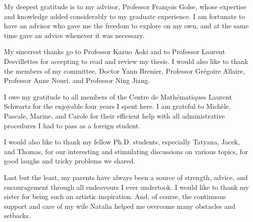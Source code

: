 My deepest gratitude is to my advisor, Professor François Golse, whose expertise and knowledge added considerably to my graduate experience. I am fortunate to have an advisor who gave me the freedom to explore on my own, and at the same time gave an advice whenever it was necessary.

My sincerest thanks go to Professor Kazuo Aoki and to Professor Laurent Desvillettes for accepting to read and review my thesis. I would also like to thank the members of my committee, Doctor Yann Brenier, Professor Grégoire Allaire, Professor Anne Nouri, and Professor Ning Jiang.

I owe my gratitude to all members of the Centre de Mathématiques Laurent Schwartz for the enjoyable four years I spent here. I am grateful to Michèle, Pascale, Marine, and Carole for their efficient help with all administrative procedures I had to pass as a foreign student.

I would also like to thank my fellow Ph.D. students, especially Tatyana, Jacek, and Thomas, for our interesting and stimulating discussions on various topics, for good laughs and tricky problems we shared.

Last but the least, my parents have always been a source of strength, advice, and encouragement through all endeavours I ever undertook. I would like to thank my sister for being such an artistic inspiration. And, of course, the continuous support and care of my wife Natalia helped me overcome many obstacles and setbacks.
